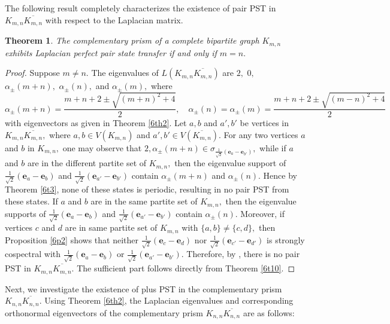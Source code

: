\documentclass[12pt,a4paper]{article}
\newtheorem{thm}{Theorem}
\def \e {{\bf e}}
\def \e {{\mathbf e}}
\newcommand{\ob}[1]{\left(#1\right)}
\begin{document}
The following result completely characterizes the existence of pair PST in $K_{m,n}\overline{K_{m,n}}$ with respect to the Laplacian matrix. 
\begin{thm}
The complementary prism of a complete bipartite graph $K_{m,n}$ exhibits Laplacian perfect pair state transfer if and only if $m=n.$
\end{thm}
\begin{proof}
Suppose $m\neq n.$
    The eigenvalues of $L\ob{K_{m,n}\overline{K_{m,n}}}$ are $2,$ $0,$ $\alpha_{\pm}(m+n),$ $\alpha_{\pm}(n),$ and $\alpha_{\pm}(m),$ where
    \[\alpha_{\pm}(m+n)=\frac{m+n+2\pm\sqrt{(m+n)^2+4}}{2},\quad\alpha_{\pm}(n)=\alpha_{\pm}(m)=\frac{m+n+2\pm\sqrt{(m-n)^2+4}}{2}\] with eigenvectors as given in Theorem \ref{6th2}. Let $a,b$ and $a',b'$ be vertices in $K_{m,n}\overline{K_{m,n}},$ where $a,b\in V(K_{m,n})$ and $a',b'\in V(\overline{K_{m,n}}).$ For any two vertices $a$ and $b$ in $K_{m,n},$ one may observe that $2,\alpha_{\pm}(m+n)\in\sigma_{\frac{1}{\sqrt{2}}\ob{\e_a-\e_{b'}}},$ while if   $a$ and $b$ are in the different partite set of $K_{m,n},$ then  the eigenvalue support of $\frac{1}{\sqrt{2}}\ob{\e_a-\e_b}$ and $\frac{1}{\sqrt{2}}\ob{\e_{a'}-\e_{b'}}$ contain $\alpha_{\pm}(m+n)$ and $\alpha_{\pm}(n).$ Hence by Theorem \ref{6t3}, none of these states is periodic, resulting in no pair PST from these states. 
    If $a$ and $b$ are in the same partite set of $K_{m,n},$ then the eigenvalue supports of  $\frac{1}{\sqrt{2}}\ob{\e_a-\e_b}$ and $\frac{1}{\sqrt{2}}\ob{\e_{a'}-\e_{b'}}$ contain $\alpha_{\pm}(n).$ Moreover, if vertices $c$ and $d$ are in same partite set of $K_{m,n}$ with $\{a,b\}\neq \{c,d\},$ then Proposition \ref{6p2} shows that neither $\frac{1}{\sqrt{2}}\ob{\e_c-\e_d}$ nor $\frac{1}{\sqrt{2}}\ob{\e_{c'}-\e_{d'}}$ is strongly cospectral with $\frac{1}{\sqrt{2}}\ob{\e_a-\e_b}$ or $\frac{1}{\sqrt{2}}\ob{\e_{a'}-\e_{b'}}.$ Therefore, by \cite[Lemma 5.1]{god7}, there is no pair PST in $K_{m,n}\overline{K_{m,n}}.$  
    The sufficient part follows directly from Theorem \ref{6t10}.
\end{proof}
Next, we investigate the existence of plus PST in the complementary prism $K_{n,n}\overline{K_{n,n}}.$ 
Using Theorem \ref{6th2}, the Laplacian eigenvalues and corresponding orthonormal eigenvectors of the complementary prism $K_{n,n}\overline{K_{n,n}}$ are as follows:
\end{document}
